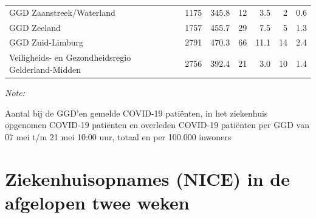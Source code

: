 \documentclass[
  english,
  man,floatsintext]{apa6}
\begin{document}
\begin{table}
\begin{threeparttable}
\begin{tabular}{lrrrrrr}
GGD Zaanstreek/Waterland & 1175 & 345.8 & 12 & 3.5 & 2 & 0.6\\
GGD Zeeland & 1757 & 455.7 & 29 & 7.5 & 5 & 1.3\\
GGD Zuid-Limburg & 2791 & 470.3 & 66 & 11.1 & 14 & 2.4\\
Veiligheids- en Gezondheidsregio Gelderland-Midden & 2756 & 392.4 & 21 & 3.0 & 10 & 1.4\\
\bottomrule
\end{tabular}
\begin{tablenotes}
\item \textit{Note: } 
\item Aantal bij de GGD’en gemelde COVID-19 patiënten, in het ziekenhuis opgenomen COVID-19 patiënten en overleden COVID-19 patiënten per GGD van 07 mei t/m 21 mei 10:00 uur, totaal en per 100.000 inwoners
\end{tablenotes}
\end{threeparttable}
\endgroup{}
\end{table}

\newpage

\hypertarget{ziekenhuisopnames-nice-in-de-afgelopen-twee-weken}{%
\section{Ziekenhuisopnames (NICE) in de afgelopen twee weken}\label{ziekenhuisopnames-nice-in-de-afgelopen-twee-weken}}
\end{document}
